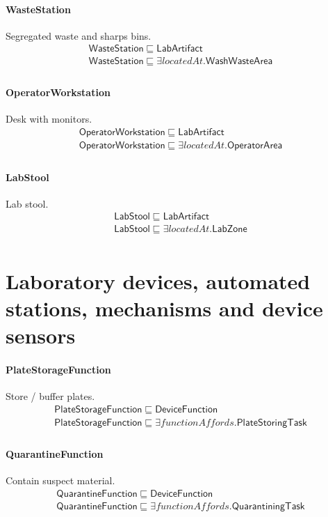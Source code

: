 \documentclass[10pt]{article}
\begin{document}
\paragraph{WasteStation} Segregated waste and sharps bins.
\[\begin{array}{l}
\mathsf{WasteStation} \sqsubseteq  \mathsf{LabArtifact} \\
\mathsf{WasteStation} \sqsubseteq  \exists \mathit{locatedAt}.\mathsf{WashWasteArea} \\
\end{array}\]
\paragraph{OperatorWorkstation} Desk with monitors.
\[\begin{array}{l}
\mathsf{OperatorWorkstation} \sqsubseteq  \mathsf{LabArtifact} \\
\mathsf{OperatorWorkstation} \sqsubseteq  \exists \mathit{locatedAt}.\mathsf{OperatorArea} \\
\end{array}\]
\paragraph{LabStool} Lab stool.
\[\begin{array}{l}
\mathsf{LabStool} \sqsubseteq  \mathsf{LabArtifact} \\
\mathsf{LabStool} \sqsubseteq  \exists \mathit{locatedAt}.\mathsf{LabZone} \\
\end{array}\]
\section*{Laboratory devices, automated stations, mechanisms and device sensors}
\paragraph{PlateStorageFunction} Store / buffer plates.
\[\begin{array}{l}
\mathsf{PlateStorageFunction} \sqsubseteq  \mathsf{DeviceFunction} \\
\mathsf{PlateStorageFunction} \sqsubseteq  \exists \mathit{functionAffords}.\mathsf{PlateStoringTask} \\
\end{array}\]
\paragraph{QuarantineFunction} Contain suspect material.
\[\begin{array}{l}
\mathsf{QuarantineFunction} \sqsubseteq  \mathsf{DeviceFunction} \\
\mathsf{QuarantineFunction} \sqsubseteq  \exists \mathit{functionAffords}.\mathsf{QuarantiningTask} \\
\end{array}\]
\end{document}
